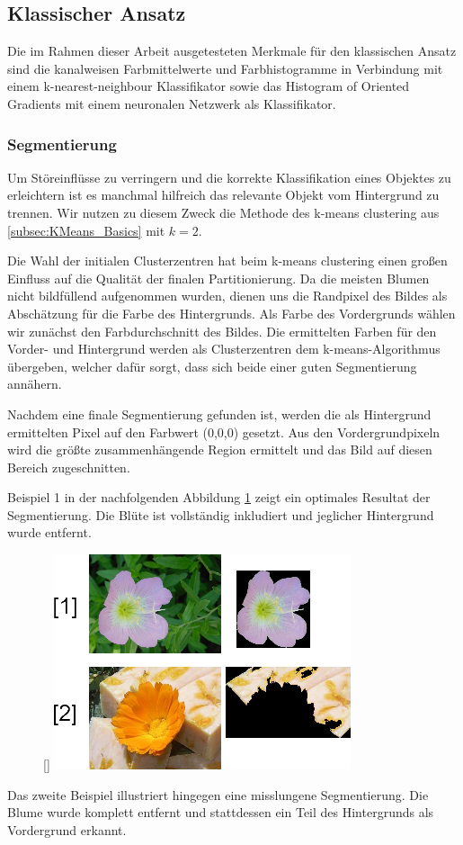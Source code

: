 \documentclass[11pt,a4paper]{article}
\begin{document}
\subsection{Klassischer Ansatz}
Die im Rahmen dieser Arbeit ausgetesteten Merkmale für den klassischen Ansatz sind die kanalweisen Farbmittelwerte und Farbhistogramme in Verbin\-dung mit einem k-nearest-neighbour Klassifikator sowie das Histogram of Oriented Gradients mit einem neuronalen Netzwerk als Klassifikator.

\subsubsection{Segmentierung}
Um Störeinflüsse zu verringern und die korrekte Klassifikation eines Objektes zu erleichtern ist es manchmal hilfreich das relevante Objekt vom Hintergrund zu trennen. Wir nutzen zu diesem Zweck die Methode des k-means clustering aus \ref{subsec:KMeans_Basics} mit $k=2$.

Die Wahl der initialen Clusterzentren hat beim k-means clustering einen großen Einfluss auf die Qualität der finalen Partitionierung. Da die meisten Blumen nicht bildfüllend aufgenommen wurden, dienen uns die Randpixel des Bildes als Abschätzung für die Farbe des Hintergrunds. Als Farbe des Vordergrunds wählen wir zunächst den Farbdurchschnitt des Bildes. Die ermittelten Farben für den Vorder- und Hintergrund werden als Clusterzentren dem k-means-Algorithmus übergeben, welcher dafür sorgt, dass sich beide einer guten Segmentierung annähern.

Nachdem eine finale Segmentierung gefunden ist, werden die als Hintergrund ermittelten Pixel auf den Farbwert (0,0,0) gesetzt. Aus den Vordergrundpixeln wird die größte zusammenhängende Region ermittelt und das Bild auf diesen Bereich zugeschnitten.

Beispiel 1 in der nachfolgenden Abbildung \ref{fig:segmentation} zeigt ein optimales Resultat der Segmentierung. Die Blüte ist vollständig inkludiert und jeglicher Hintergrund wurde entfernt.

\begin{figure}
	\raisebox{0pt}[\dimexpr{}\baselineskip\relax]{
		\includegraphics[scale=.5]{Segmentierung.png}
	}
	\label{fig:segmentation}
\end{figure}
Das zweite Beispiel illustriert hingegen eine misslungene Segmentierung. Die Blume wurde komplett entfernt und statt\-dessen ein Teil des Hintergrunds als Vordergrund erkannt.
\end{document}
